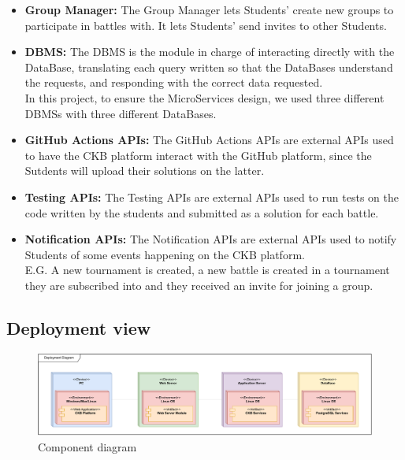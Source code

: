 \documentclass{article}
\begin{document}
{\begin{itemize}
The Evaluation Manager also lets Educators manually evaluate each Student's solution, and upload the grade to the platform via the Tournament DBMS.\\
\item \textbf{Group Manager:} The Group Manager lets Students' create new groups to participate in battles with. It lets Students' send invites to other Students.\\
\item \textbf{DBMS:} The DBMS is the module in charge of interacting directly with the DataBase, translating each query written so that
the DataBases understand the requests, and responding with the correct data requested.\\
In this project, to ensure the MicroServices design, we used three different DBMSs with three different DataBases.\\
\item \textbf{GitHub Actions APIs:} The GitHub Actions APIs are external APIs used to have the CKB platform interact with the GitHub platform, since the Sutdents will
upload their solutions on the latter. \\
\item \textbf{Testing APIs:} The Testing APIs are external APIs used to run tests on the code written by the students and submitted as a solution for each battle.\\
\item \textbf{Notification APIs:} The Notification APIs are external APIs used to notify Students of some events happening on the CKB platform.\\
E.G. A new tournament is created, a new battle is created in a tournament they are subscribed into and they received an invite for joining a group. \\
\end{itemize}
\subsection{Deployment view}
\begin{figure}[H]
    \centering
    \hspace*{-2.1cm}\includegraphics[scale=0.53]{images/DeploymentDiagram.pdf}
    \caption{Component diagram}
    \label{fig:deploymentDiagram}
\end{figure}

}
\end{document}
